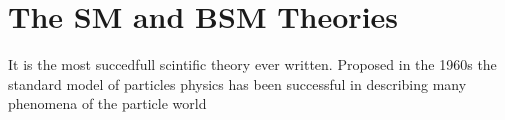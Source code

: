 \chapter{The SM and BSM Theories}\label{ch:smandbsm}

It is the most succedfull scintific theory ever written.  Proposed in the 1960s the standard model of particles physics has been successful in describing many phenomena of the particle world
